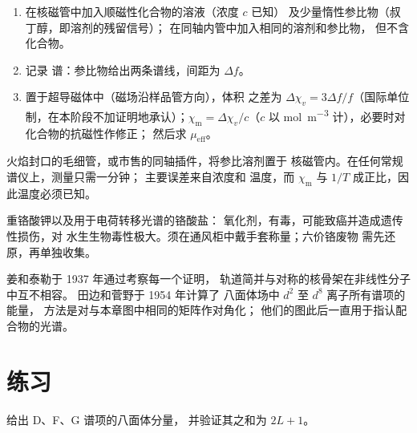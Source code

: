 \begin{method}[用埃文斯方法测定磁矩]\label{met:b3:complex-spectra-magnetism:evans}
\begin{enumerate}
  \item 在核磁管中加入顺磁性化合物的溶液（浓度 $c$ 已知）
        及少量惰性参比物（叔丁醇，即溶剂的残留信号）；
        在同轴内管中加入相同的溶剂和参比物，
        但不含化合物。
  \item 记录  谱：参比物给出两条谱线，间距为 $\Delta f$。
  \item 置于超导磁体中（磁场沿样品管方向），体积
        之差为 $\Delta\chi_v = 3\Delta f/f$（国际单位制，在本阶段不加证明地承认）；$\chi_{\mathrm m} = \Delta\chi_v/c$（$c$ 以
        \unit{mol.m^{-3}} 计），必要时对化合物的抗磁性作修正；
        然后求 $\mu_{\mathrm{eff}}$。
\end{enumerate}
\end{method}

\begin{inthelab}[一次埃文斯测量]
火焰封口的毛细管，或市售的同轴插件，将参比溶剂置于
核磁管内。在任何常规谱仪上，测量只需一分钟；
主要误差来自浓度和
温度，而 $\chi_{\mathrm m}$ 与 $1/T$ 成正比，因此温度必须已知。
\end{inthelab}

\begin{safety}{}
重铬酸钾以及用于电荷转移光谱的铬酸盐：
氧化剂，有毒，可能致癌并造成遗传性损伤，对
水生生物毒性极大。须在通风柜中戴手套称量；六价铬废物
需先还原，再单独收集。
\end{safety}

\begin{history}
姜和泰勒于 1937 年通过考察每一个证明，
轨道简并与对称的核骨架在非线性分子中互不相容。
田边和菅野于 1954 年计算了
八面体场中 $d^2$ 至 $d^8$ 离子所有谱项的能量，
方法是对与本章图中相同的矩阵作对角化；
他们的图此后一直用于指认配合物的光谱。
\end{history}

\section{练习}

\begin{exercise}[$\star$]\label{exo:b3:complex-spectra-magnetism:1}
给出 D、F、G 谱项的八面体分量，
并验证其之和为 $2L + 1$。
\end{exercise}

